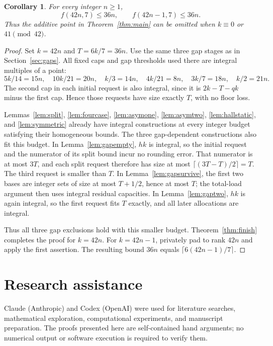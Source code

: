 \documentclass[11pt]{article}
\numberwithin{equation}{section}
\newtheorem{corollary}[theorem]{Corollary}
\theoremstyle{definition}
\theoremstyle{remark}
\begin{document}
\begin{corollary}\label{cor:arithmetic}
For every integer $n\ge1$,
\[
 f(42n,7)\le36n,\qquad f(42n-1,7)\le36n.
\]
Thus the additive point in Theorem~\ref{thm:main} can be omitted when
$k\equiv0$ or $41\pmod{42}$.
\end{corollary}
\begin{proof}
Set $k=42n$ and $T=6k/7=36n$. Use the same three gap stages as in
Section~\ref{sec:gaps}. All fixed caps and gap thresholds used there
are integral multiples of a point:
\[
 5k/14=15n,\quad 10k/21=20n,\quad k/3=14n,\quad
 4k/21=8n,\quad 3k/7=18n,\quad k/2=21n.
\]
The second cap in each initial request is also integral, since it is
$2k-T-qk$ minus the first cap. Hence those requests have size exactly
$T$, with no floor loss.

Lemmas~\ref{lem:split}, \ref{lem:fourcase}, \ref{lem:asymone},
\ref{lem:asymtwo}, \ref{lem:hallstatic}, and \ref{lem:symmetric} already
have integral constructions at every integer budget satisfying their
homogeneous bounds. The three gap-dependent constructions also fit this
budget. In Lemma~\ref{lem:gapempty}, $hk$ is integral, so the initial
request and the numerator of its split bound incur no rounding error.
That numerator is at most $3T$, and each split request therefore has
size at most $\lceil(3T-T)/2\rceil=T$. The third request is smaller
than $T$. In Lemma~\ref{lem:gapsurvive}, the first two bases are integer
sets of size at most $T+1/2$, hence at most $T$; the total-load argument
then uses integral residual capacities. In Lemma~\ref{lem:gaptwo},
$hk$ is again integral, so the first request fits $T$ exactly, and all
later allocations are integral.

Thus all three gap exclusions hold with this smaller budget.
Theorem~\ref{thm:finish} completes the proof for $k=42n$.
For $k=42n-1$, privately pad to rank $42n$ and apply the first assertion.
The resulting bound $36n$ equals $\lceil6(42n-1)/7\rceil$.
\end{proof}

\appendix




\section*{Research assistance}
Claude (Anthropic) and Codex (OpenAI) were used for literature searches,
mathematical exploration, computational experiments, and manuscript
preparation. The proofs presented here are self-contained hand arguments;
no numerical output or software execution is required to verify them.
\end{document}
